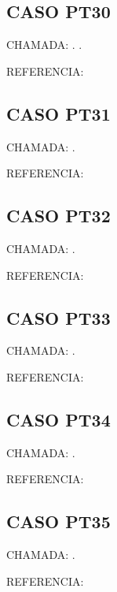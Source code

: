 \documentclass{undftex}
\begin{document}
\begin{refsection}\section*{CASO PT30} CHAMADA: . \textcite{pt02}. \textcite{ptbook}\par REFERENCIA:\par\printbibliography[heading=none,check=undfconsultadas]\end{refsection}\clearpage
\begin{refsection}\section*{CASO PT31} CHAMADA: . \textcite{ev30}\par REFERENCIA:\par\printbibliography[heading=none,check=undfconsultadas]\end{refsection}\clearpage
\begin{refsection}\section*{CASO PT32} CHAMADA: . \textcite{pi28}\par REFERENCIA:\par\printbibliography[heading=none,check=undfconsultadas]\end{refsection}\clearpage
\begin{refsection}\section*{CASO PT33} CHAMADA: . \textcite{pt33}\par REFERENCIA:\par\printbibliography[heading=none,check=undfconsultadas]\end{refsection}\clearpage
\begin{refsection}\section*{CASO PT34} CHAMADA: . \textcite{pt34}\par REFERENCIA:\par\printbibliography[heading=none,check=undfconsultadas]\end{refsection}\clearpage
\begin{refsection}\section*{CASO PT35} CHAMADA: . \textcite{pt35}\par REFERENCIA:\par\printbibliography[heading=none,check=undfconsultadas]\end{refsection}\clearpage
\end{document}
